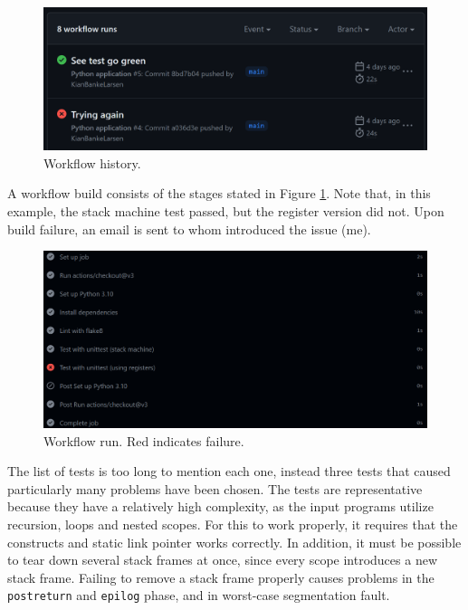 \begin{figure}[H]
    \centering
    \includegraphics[width=1\textwidth]{misc/images/Workflow.png}
    \caption{Workflow history.}
\end{figure}

A workflow build consists of the stages stated in Figure \ref{fig:workflow_run}.  Note that, in this example, the stack machine test passed, but the register version did not. Upon build failure, an email is sent to whom introduced the issue (me).

\begin{figure}[H]
    \centering
    \includegraphics[width=1\textwidth]{misc/images/workflow_run.png}
    \caption{Workflow run. Red indicates failure.}
    \label{fig:workflow_run}
\end{figure}

The list of tests is too long to mention each one, instead three tests that caused particularly many problems have been chosen. The tests are representative because they have a relatively high complexity, as the input programs utilize recursion, loops and nested scopes. For this to work properly, it requires that the constructs and static link pointer works correctly. In addition, it must be possible to tear down several stack frames at once, since every scope introduces a new stack frame. Failing to remove a stack frame properly causes problems in the \texttt{postreturn} and \texttt{epilog} phase, and in worst-case segmentation fault. 

